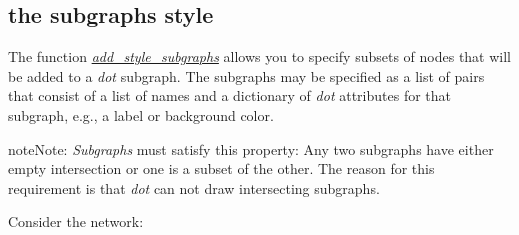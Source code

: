 \documentclass[letterpaper,10pt,english]{sphinxmanual}
\begin{document}
\subsection{the subgraphs style}
\label{Manual:the-subgraphs-style}
The function {\hyperref[StateTransitionGraphs:add-style-subgraphs]{\emph{add\_style\_subgraphs}}} allows you to specify subsets of nodes that will be added to a \emph{dot} subgraph.
The subgraphs may be specified as a list of pairs that consist of a list of names and a dictionary
of \emph{dot} attributes for that subgraph, e.g., a label or background color.

\begin{notice}{note}{Note:}
\emph{Subgraphs} must satisfy this property:
Any two subgraphs have either empty intersection or one is a subset of the other.
The reason for this requirement is that \emph{dot} can not draw intersecting subgraphs.
\end{notice}

Consider the network:
\end{document}
